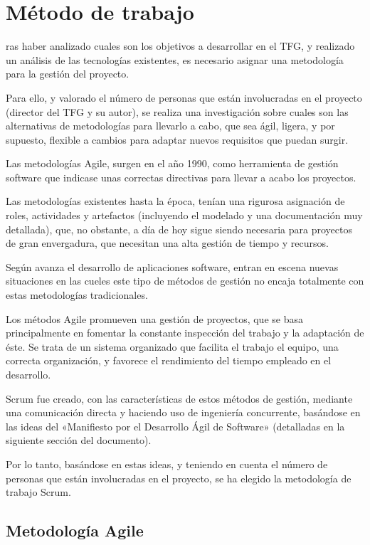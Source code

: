 \chapter{Método de trabajo}
\label{chap:metodo}
ras haber analizado cuales son los objetivos a desarrollar en el TFG, y realizado un análisis de las tecnologías existentes, es necesario asignar una metodología para la gestión del proyecto. 

Para ello, y valorado el número de personas que están involucradas en el proyecto (director del TFG y su autor), se realiza una investigación sobre cuales son las alternativas de metodologías para llevarlo a cabo, que sea ágil, ligera, y por supuesto, flexible a cambios para adaptar nuevos requisitos que puedan surgir.

Las metodologías Agile, surgen en el año 1990, como herramienta de gestión software que indicase unas correctas directivas para llevar a acabo los proyectos. 

Las metodologías existentes hasta la época, tenían una rigurosa asignación de roles, actividades y artefactos (incluyendo el modelado y una documentación muy detallada), que, no obstante, a día de hoy sigue siendo necesaria para proyectos de gran envergadura, que necesitan una alta gestión de tiempo y recursos. 

Según avanza el desarrollo de aplicaciones software, entran en escena nuevas situaciones en las cueles este tipo de métodos de gestión no encaja totalmente con estas metodologías tradicionales. 

Los métodos Agile promueven una gestión de proyectos, que se basa principalmente en fomentar la constante inspección del trabajo y la adaptación de éste. Se trata de un sistema organizado que facilita el trabajo el equipo, una correcta organización, y favorece el rendimiento del tiempo empleado en el desarrollo.

Scrum fue creado, con las características de estos métodos de gestión, mediante una comunicación directa y haciendo uso de ingeniería concurrente, basándose en las ideas del «Manifiesto por el Desarrollo Ágil de Software» (detalladas en la siguiente sección del documento).

Por lo tanto, basándose en estas ideas, y teniendo en cuenta el número de personas que están involucradas en el proyecto, se ha elegido la metodología de trabajo Scrum.


\section{Metodología Agile}



